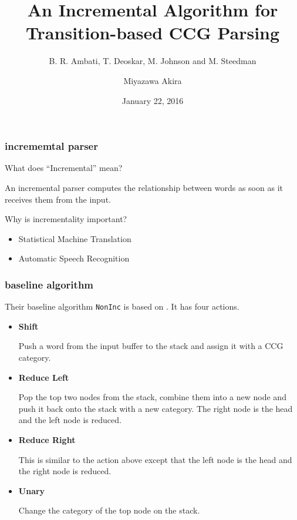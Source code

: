 \documentclass[10pt,usepdftitle=false,hyperref={unicode}]{beamer}
\title{\LARGE An Incremental Algorithm for Transition-based CCG Parsing}
\subtitle{\normalsize B. R. Ambati, T. Deoskar, M. Johnson and M. Steedman}
\author{Miyazawa Akira}
\institute{The Graduate University For Advanced Studies / National Institute of Informatics}
\date{January 22, 2016}
\begin{document}
\maketitle

\begin{frame}
    \frametitle{incrememtal parser}
    \nocite{ambati2015}
    What does ``Incremental'' mean?

    \begin{indentation}{10pt}{0pt}
        An incremental parser
        computes the relationship between words as soon as
        it receives them from the input.
    \end{indentation}

    \bigskip

    Why is incrementality important?
    \begin{itemize}
        \item Statistical Machine Translation
        \item Automatic Speech Recognition
    \end{itemize}
\end{frame}

\begin{frame}
    \frametitle{baseline algorithm}
    Their baseline algorithm \texttt{NonInc} is based on \cite{zhang2011}.
    It has four actions.
    \begin{itemize}
        \item \textbf{Shift}

            Push a word from the input buffer to the stack and assign it with a CCG category.

        \item \textbf{Reduce Left}

            Pop the top two nodes from the stack, combine them into a new node and push it back onto the stack with a new category.
            The right node is the head and the left node is reduced.

        \item \textbf{Reduce Right}

            This is similar to the action above except that the left node is the head and the right node is reduced.

        \item \textbf{Unary}

            Change the category of the top node on the stack.
    \end{itemize}
\end{frame}
\end{document}
